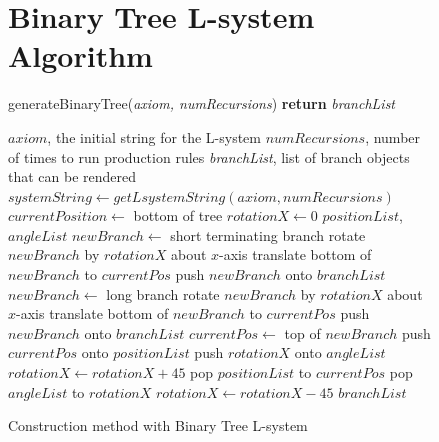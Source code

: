 \documentclass[final]{cmpreport}
\begin{document}
\begin{figure}[ht]
    \section{Binary Tree L-system Algorithm}
    \label{app:b-tree-lsystem-algo}
    \begin{algorithm}[H]
    \caption{generateBinaryTree(\emph{axiom, numRecursions}) {\textbf{return}} \emph{branchList}}
        \begin{algorithmic}[1]
        \Require $axiom$, the initial string for the L-system
        \Require $numRecursions$, number of times to run production rules
        \Ensure \emph{branchList}, list of branch objects that can be rendered
        \State $systemString \leftarrow getLsystemString(axiom, numRecursions)$
        \State $currentPosition \leftarrow$ bottom of tree
        \State $rotationX \leftarrow 0$
        \State $positionList$, $angleList$ 
                \State $newBranch \leftarrow$ short terminating branch
                \State rotate $newBranch$ by $rotationX$ about $x$-axis
                \State translate bottom of $newBranch$ to $currentPos$
                \State push $newBranch$ onto $branchList$
                \State $newBranch \leftarrow$ long branch
                \State rotate $newBranch$ by $rotationX$ about $x$-axis
                \State translate bottom of $newBranch$ to $currentPos$
                \State push $newBranch$ onto $branchList$
                \State $currentPos \leftarrow$ top of $newBranch$
            \ElsIf{$character$ = $[$}
                \State push $currentPos$ onto $positionList$
                \State push $rotationX$ onto $angleList$
                \State $rotationX \leftarrow rotationX + 45$
            \ElsIf{$character$ = $]$}
                \State pop $positionList$ to $currentPos$
                \State pop $angleList$ to $rotationX$
                \State $rotationX \leftarrow rotationX - 45$
            \EndIf
        \EndFor
        \State \Return $branchList$
        \end{algorithmic}
    \end{algorithm}
    \caption{Construction method with Binary Tree L-system}
\end{figure}
\end{document}
